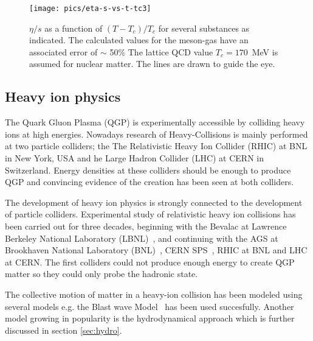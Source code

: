 \begin{figure}[htb]
\centering
\texttt{[image: pics/eta-s-vs-t-tc3]}
\caption[$\eta/s$ vs $(T-T_c)/T_c$]{\label{fig3}$\eta/s$ as a function of $(T-T_c)/T_c$ for several substances as indicated.
	The calculated values for the meson-gas have an associated error 
	of $\sim$ 50\% %
	The lattice QCD value $T_c = 170$~MeV %
	is assumed for nuclear matter. The lines are drawn to guide the eye.~\cite{PhysRevLett.98.092301}
}
\label{fig:etas}
\end{figure}



\FloatBarrier
\pagebreak
\subsection{Heavy ion physics}
The Quark Gluon Plasma (QGP) is experimentally accessible by colliding heavy ions at high energies. Nowadays research of Heavy-Collisions is mainly performed at two particle colliders; the The Relativistic Heavy Ion Collider (RHIC) at BNL in New York, USA and he Large Hadron Collider (LHC) at CERN in Switzerland. Energy densities at these colliders should be enough to produce QGP and convincing evidence of the creation has been seen at both colliders.

The development of heavy ion physics is strongly connected to the development of particle colliders. Experimental study of relativistic heavy ion collisions has been carried out for three decades, beginning with the Bevalac at Lawrence Berkeley National Laboratory (LBNL)~\cite{Lofgren_1975}, and continuing with the AGS at Brookhaven National Laboratory (BNL)~\cite{Barton:1987}, CERN SPS~\cite{Vitev:2002pf}, RHIC at BNL and LHC at CERN. The first colliders could not produce enough energy to create QGP matter so they could only probe the hadronic state. 

The collective motion of matter in a heavy-ion collision has been modeled using several models e.g. the Blast wave Model~\cite{PhysRevC.84.064905} has been used succesfully. Another model growing in popularity is the hydrodynamical approach which is further discussed in section \ref{sec:hydro}.

